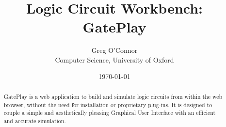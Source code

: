 \documentclass[a4paper,notitlepage]{report}
\begin{document}
\title{Logic Circuit Workbench: GatePlay}
\author{Greg O'Connor \\
		Computer Science, University of Oxford}
\date{\today}
\maketitle

\begin{abstract}
GatePlay is a web application to build and simulate logic circuits from within the web browser, without the need for installation or proprietary plug-ins. It is designed to couple a simple and aesthetically pleasing Graphical User Interface with an efficient and accurate simulation.
\end{abstract}
\clearpage

\tableofcontents
\clearpage


\clearpage

\clearpage

\clearpage

\clearpage

\clearpage

\clearpage

\clearpage

\end{document}
